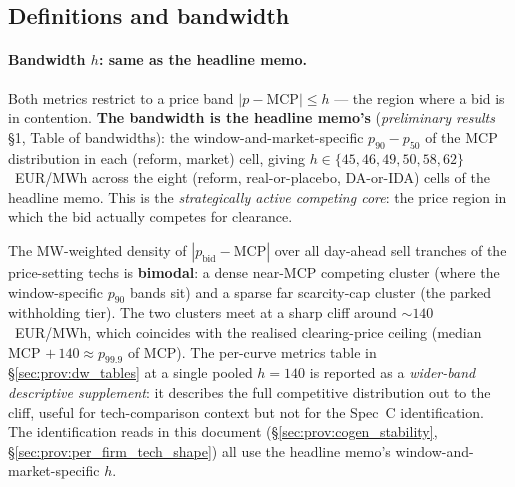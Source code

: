 \documentclass[11pt,a4paper]{article}
\begin{document}
\subsection{Definitions and bandwidth}\label{sec:prov:per_curve_def}

\paragraph{Bandwidth $h$: same as the headline memo.} Both metrics restrict to a price band $|p - \text{MCP}| \le h$ --- the region where a bid is in contention. \textbf{The bandwidth is the headline memo's} (\emph{preliminary results} \S 1, Table of bandwidths): the window-and-market-specific $p_{90} - p_{50}$ of the MCP distribution in each (reform, market) cell, giving $h \in \{45, 46, 49, 50, 58, 62\}$~EUR/MWh across the eight (reform, real-or-placebo, DA-or-IDA) cells of the headline memo. This is the \emph{strategically active competing core}: the price region in which the bid actually competes for clearance.

The MW-weighted density of $|p_{\text{bid}} - \text{MCP}|$ over all day-ahead sell tranches of the price-setting techs is \textbf{bimodal}: a dense near-MCP competing cluster (where the window-specific $p_{90}$ bands sit) and a sparse far scarcity-cap cluster (the parked withholding tier). The two clusters meet at a sharp cliff around $\sim\!140$~EUR/MWh, which coincides with the realised clearing-price ceiling (median MCP $+\,140 \approx p_{99.9}$ of MCP). The per-curve metrics table in \S\ref{sec:prov:dw_tables} at a single pooled $h = 140$ is reported as a \emph{wider-band descriptive supplement}: it describes the full competitive distribution out to the cliff, useful for tech-comparison context but not for the Spec~C identification. The identification reads in this document (\S\ref{sec:prov:cogen_stability}, \S\ref{sec:prov:per_firm_tech_shape}) all use the headline memo's window-and-market-specific $h$.
\end{document}
